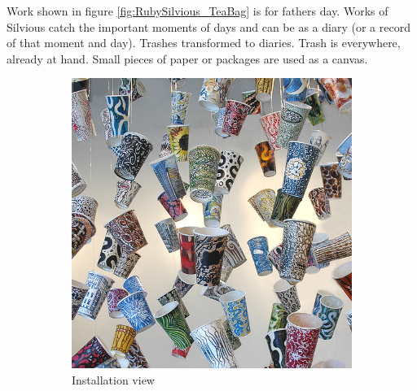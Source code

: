 Work shown in figure \ref{fig:RubySilvious_TeaBag} is for fathers day. Works of Silvious catch the important moments of days and can be as a diary (or a record of that moment and day). Trashes transformed to diaries. Trash is everywhere, already at hand. Small pieces of paper or packages are used as a canvas. 

\begin{figure}[h!]
\begin{subfigure}{.48\textwidth}
  \centering
  \includegraphics[width=\linewidth]{graphics/Gwyneth-Leech-cup5.jpg}
  \caption{Installation view}
  \label{fig:GwynethLeech_Installation}
\end{subfigure}
\hfill
\begin{subfigure}{.48\textwidth}
  \centering

\end{subfigure}
\end{figure}
